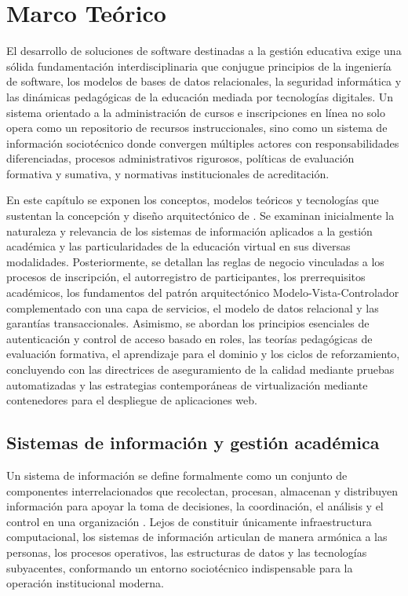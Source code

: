 \chapter{Marco Teórico}

El desarrollo de soluciones de software destinadas a la gestión educativa exige una sólida fundamentación interdisciplinaria que conjugue principios de la ingeniería de software, los modelos de bases de datos relacionales, la seguridad informática y las dinámicas pedagógicas de la educación mediada por tecnologías digitales. Un sistema orientado a la administración de cursos e inscripciones en línea no solo opera como un repositorio de recursos instruccionales, sino como un sistema de información sociotécnico donde convergen múltiples actores con responsabilidades diferenciadas, procesos administrativos rigurosos, políticas de evaluación formativa y sumativa, y normativas institucionales de acreditación.

En este capítulo se exponen los conceptos, modelos teóricos y tecnologías que sustentan la concepción y diseño arquitectónico de . Se examinan inicialmente la naturaleza y relevancia de los sistemas de información aplicados a la gestión académica y las particularidades de la educación virtual en sus diversas modalidades. Posteriormente, se detallan las reglas de negocio vinculadas a los procesos de inscripción, el autorregistro de participantes, los prerrequisitos académicos, los fundamentos del patrón arquitectónico Modelo-Vista-Controlador complementado con una capa de servicios, el modelo de datos relacional y las garantías transaccionales. Asimismo, se abordan los principios esenciales de autenticación y control de acceso basado en roles, las teorías pedagógicas de evaluación formativa, el aprendizaje para el dominio y los ciclos de reforzamiento, concluyendo con las directrices de aseguramiento de la calidad mediante pruebas automatizadas y las estrategias contemporáneas de virtualización mediante contenedores para el despliegue de aplicaciones web.

\section{Sistemas de información y gestión académica}

Un sistema de información se define formalmente como un conjunto de componentes interrelacionados que recolectan, procesan, almacenan y distribuyen información para apoyar la toma de decisiones, la coordinación, el análisis y el control en una organización \cite{laudon2020management}. Lejos de constituir únicamente infraestructura computacional, los sistemas de información articulan de manera armónica a las personas, los procesos operativos, las estructuras de datos y las tecnologías subyacentes, conformando un entorno sociotécnico indispensable para la operación institucional moderna.

